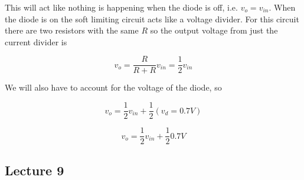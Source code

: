 \documentclass[../notes.tex]{subfiles}
\begin{document}
This will act like nothing is happening when the diode is off, i.e. $ v_o = v_{in}  $. When the diode is on the soft limiting circuit acts like a voltage divider.
For this circuit there are two resistors with the same $ R $ so the output voltage from just the current divider is

\begin{equation}
	v_o = \frac{R}{R+R} v_{in}  = \frac{1}{2} v_{in}
\end{equation}

We will also have to account for the voltage of the diode, so

\begin{equation}
	v_o = \frac{1}{2} v_{in}  + \frac{1}{2} (v_d = 0.7V)
\end{equation}







\begin{equation}
	v_o = \frac{1}{2} v_{in} + \frac{1}{2} 0.7V
\end{equation}



\subsection{Lecture 9}
\end{document}
